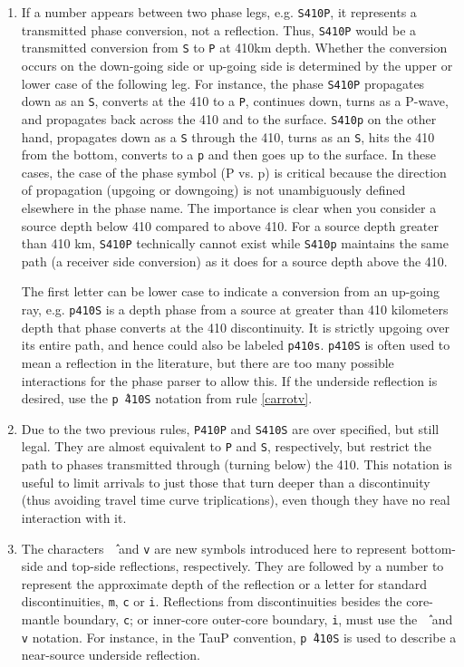 \begin{enumerate}
\item If a number appears between two phase legs, e.g. \texttt{S410P}, 
it represents a transmitted phase conversion, not a reflection. 
Thus, \texttt{S410P} would be a transmitted conversion
from \texttt{S} to \texttt{P} at 410km depth.
Whether the conversion occurs
on the down-going side or up-going side is determined by the upper or lower 
case of the following leg. 
For instance, the phase \texttt{S410P} 
propagates down as an \texttt{S}, converts at the 410 
to a \texttt{P}, continues down, turns as a P-wave, and propagates back across the 
410 and to the surface. 
\texttt{S410p} on the other hand, propagates down 
as a \texttt{S} through the 410, turns as an \texttt{S}, 
hits the 410 from the bottom, converts to a \texttt{p} and then goes up to the surface. 
In these cases, the case of the phase symbol (P vs. p) is critical because the direction
of propagation (upgoing or downgoing) is not unambiguously defined elsewhere in the
phase name.  
The importance is clear when you consider a source depth below 410 compared to above 410.  
For a source depth greater than 410 km, \texttt{S410P} technically cannot exist while
\texttt{S410p} maintains the same path (a receiver side conversion) as it does for a
source depth above the 410.

The first letter can be lower case to indicate a conversion from
an up-going ray, e.g. \texttt{p410S} is a depth phase from 
a source at greater than 410 kilometers depth that phase converts
at the 410 discontinuity. 
It is strictly upgoing over
its entire path, and hence could also be labeled \texttt{p410s}.
\texttt{p410S} is often used to mean a reflection in the literature, but there
are too many possible interactions for the phase parser to allow this. 
If the underside reflection is desired, use the \texttt{p\^\,410S} notation from
rule \ref{carrotv}.

\item Due to the two previous rules, \texttt{P410P} and \texttt{S410S} 
are over specified, but still legal. 
They are almost equivalent to \texttt{P} and \texttt{S}, respectively,
but restrict the path to phases transmitted through (turning below) the 410.
This notation is useful to
limit arrivals to just those that turn deeper than a discontinuity (thus avoiding
travel time curve triplications), even though they have no real interaction with it.

\item \label{carrotv}
The characters \texttt{\^\,} and \texttt{v} are new symbols introduced here to
represent bottom-side and top-side reflections, respectively. 
They are followed by a number to 
represent the approximate depth of the reflection or
a letter for standard discontinuities, \texttt{m}, \texttt{c} or \texttt{i}. 
Reflections from discontinuities besides the
core-mantle boundary, \texttt{c}; 
or inner-core outer-core boundary, \texttt{i}, must use the \texttt{\^\,}
and \texttt{v} notation. 
For instance, in the TauP convention, \texttt{p\^\,410S} is used to describe
a near-source underside reflection.


\end{enumerate}
